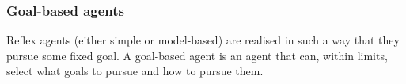 \subsubsection*{Goal-based agents}
Reflex agents (either simple or model-based) are realised in such a way that they pursue
some fixed goal.\newline
A goal-based agent is an agent that can, within limits, select what goals to pursue and how
to pursue them.